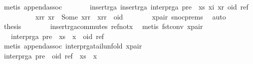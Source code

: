 \begin{isabellebody}
\ {\isacharparenleft}metis\ append{\isacharunderscore}assoc{\isacharparenright}\isanewline
\ \ \isamarkupfalse%
\ \isamarkupfalse%
\ {\isachardoublequoteopen}{\isachardot}{\isachardot}{\isachardot}\ {\isacharequal}\ insert{\isacharunderscore}rga\ {\isacharparenleft}insert{\isacharunderscore}rga\ {\isacharparenleft}interp{\isacharunderscore}rga\ {\isacharparenleft}pre\ {\isacharat}\ xs{\isacharparenright}{\isacharparenright}\ {\isacharparenleft}xi{\isacharcomma}\ xr{\isacharparenright}{\isacharparenright}\ {\isacharparenleft}oid{\isacharcomma}\ ref{\isacharparenright}{\isachardoublequoteclose}\isanewline
\ \ \isamarkupfalse%
\ {\isacharminus}\isanewline
\ \ \ \ \isamarkupfalse%
\ {\isachardoublequoteopen}{\isasymAnd}xrr{\isachardot}\ xr\ {\isacharequal}\ Some\ xrr\ {\isasymLongrightarrow}\ xrr\ {\isasymnoteq}\ oid{\isachardoublequoteclose}\isanewline
\ \ \ \ \ \ \isamarkupfalse%
\ x{\isacharunderscore}pair\ snoc{\isachardot}prems{\isacharparenleft}{}{\isacharparenright}\ \isamarkupfalse%
\ auto\isanewline
\ \ \ \ \isamarkupfalse%
\ {\isacharquery}thesis\isanewline
\ \ \ \ \ \ \isamarkupfalse%
\ insert{\isacharunderscore}rga{\isacharunderscore}commutes\ ref{\isacharunderscore}not{\isacharunderscore}x\ \isamarkupfalse%
\ {\isacharparenleft}metis\ fst{\isacharunderscore}conv\ x{\isacharunderscore}pair{\isacharparenright}\isanewline
\ \ \isamarkupfalse%
\isanewline
\ \ \isamarkupfalse%
\ \isamarkupfalse%
\ {\isachardoublequoteopen}{\isachardot}{\isachardot}{\isachardot}\ {\isacharequal}\ interp{\isacharunderscore}rga\ {\isacharparenleft}pre\ {\isacharat}\ xs\ {\isacharat}\ {\isacharbrackleft}x{\isacharbrackright}\ {\isacharat}\ {\isacharbrackleft}{\isacharparenleft}oid{\isacharcomma}\ ref{\isacharparenright}{\isacharbrackright}{\isacharparenright}{\isachardoublequoteclose}\isanewline
\ \ \ \ \isamarkupfalse%
\ {\isacharparenleft}metis\ append{\isacharunderscore}assoc\ interp{\isacharunderscore}rga{\isacharunderscore}tail{\isacharunderscore}unfold\ x{\isacharunderscore}pair{\isacharparenright}\isanewline
\ \ \isamarkupfalse%
\ \isamarkupfalse%
\ {\isachardoublequoteopen}interp{\isacharunderscore}rga\ {\isacharparenleft}pre\ {\isacharat}\ {\isacharparenleft}oid{\isacharcomma}\ ref{\isacharparenright}\ {\isacharhash}\ xs\ {\isacharat}\ {\isacharbrackleft}x{\isacharbrackright}{\isacharparenright}\ {\isacharequal}\isanewline

\end{isabellebody}
